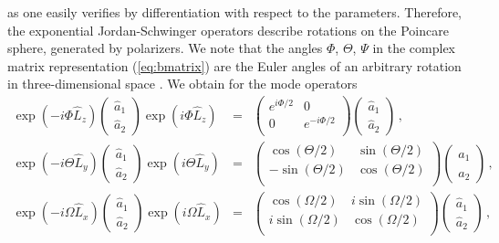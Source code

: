 \documentclass[12pt,amsmath,amssymb]{article}
\numberwithin{equation}{section}
\begin{document}
as one easily verifies by differentiation with respect to the
parameters. Therefore, the exponential Jordan-Schwinger operators
describe rotations on the Poincare sphere, generated by
polarizers. We note that the angles $\Phi$, $\Theta$, $\Psi$ in
the complex matrix representation (\ref{eq:bmatrix}) are the
Euler angles of an arbitrary rotation in three-dimensional space
\cite{LL1}. We obtain for the mode operators
\begin{eqnarray}
\exp(-i\Phi\hat{L}_z) \left(
    \begin{array}{c}
     \hat{a}_1 \\
     \hat{a}_2
    \end{array}
\right) \exp(i\Phi\hat{L}_z) &=& \left(
    \begin{array}{cc}
      e^{i\Phi/2} & 0\\
      0 & e^{-i\Phi/2}\\
    \end{array}
\right) \left(
    \begin{array}{c}
     \hat{a}_1 \\
     \hat{a}_2
    \end{array}
\right) \,, \nonumber\\
\exp(-i\Theta\hat{L}_y) \left(
    \begin{array}{c}
     \hat{a}_1 \\
     \hat{a}_2
    \end{array}
\right) \exp(i\Theta\hat{L}_y) &=& \left(
    \begin{array}{cc}
      \cos(\Theta/2) & \sin(\Theta/2)\\
      -\sin(\Theta/2) & \cos(\Theta/2)\\
    \end{array}
\right) \left(
    \begin{array}{c}
     \hat{a}_1 \\
     \hat{a}_2
    \end{array}
\right) \,, \nonumber\\
\exp(-i\Omega\hat{L}_x) \left(
    \begin{array}{c}
     \hat{a}_1 \\
     \hat{a}_2
    \end{array}
\right) \exp(i\Omega\hat{L}_x) &=& \left(
    \begin{array}{cc}
       \cos(\Omega/2) & i\sin(\Omega/2)\\
       i\sin(\Omega/2) & \cos(\Omega/2)\\
    \end{array}
\right) \left(
    \begin{array}{c}
     \hat{a}_1 \\
     \hat{a}_2
    \end{array}
\right) \,,
\label{eq:moderot}
\end{eqnarray}
\end{document}
